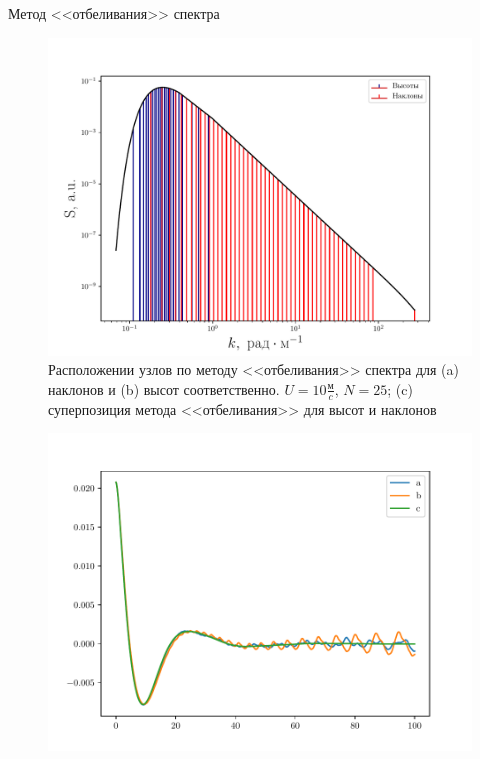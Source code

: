 \begin{frame}[t]{}
\begin{columns}[t]
\begin{column}{.48\linewidth}
\begin{block}{Метод <<отбеливания>> спектра}
\begin{figure}[H]
\begin{minipage}{0.32\linewidth}
                    \end{minipage}
                    \begin{minipage}{0.32\linewidth}
                            \centering
                    \vspace{-15pt}
                            \includegraphics[width=\linewidth]{nodes}
                    \end{minipage}
                    \caption{Расположении узлов по методу <<отбеливания>> спектра  для (a) наклонов и (b) высот соответственно. $U=10 \frac{\text{м}}{c}$, $N=25$; (c) суперпозиция 
                    метода <<отбеливания>> для высот и наклонов}
                    \label{fig:splits}		
                \end{figure}
                \begin{figure}[h]
                    \centering
                    \begin{minipage}{0.49\linewidth}
                            \centering
                            \includegraphics[width=\linewidth]{fig/corr1}


\end{minipage}
\end{figure}
\end{block}
\end{column}
\end{columns}
\end{frame}
